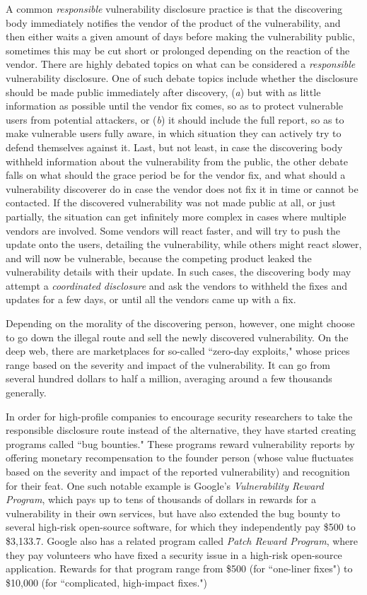 \documentclass[a4paper,12pt]{article}
\begin{document}
	A common \textit{responsible} vulnerability disclosure practice is that the discovering body immediately notifies the vendor of the product of the vulnerability, and then either waits a given amount of days before making the vulnerability public, sometimes this may be cut short or prolonged depending on the reaction of the vendor. There are highly debated topics on what can be considered a \textit{responsible} vulnerability disclosure. One of such debate topics include whether the disclosure should be made public immediately after discovery, (\textit{a}) but with as little information as possible until the vendor fix comes, so as to protect vulnerable users from potential attackers, or (\textit{b}) it should include the full report, so as to make vulnerable users fully aware, in which situation they can actively try to defend themselves against it. Last, but not least, in case the discovering body withheld information about the vulnerability from the public, the other debate falls on what should the grace period be for the vendor fix, and what should a vulnerability discoverer do in case the vendor does not fix it in time or cannot be contacted. If the discovered vulnerability was not made public at all, or just partially, the situation can get infinitely more complex in cases where multiple vendors are involved. Some vendors will react faster, and will try to push the update onto the users, detailing the vulnerability, while others might react slower, and will now be vulnerable, because the competing product leaked the vulnerability details with their update. In such cases, the discovering body may attempt a \textit{coordinated disclosure} and ask the vendors to withheld the fixes and updates for a few days, or until all the vendors came up with a fix.
	
	Depending on the morality of the discovering person, however, one might choose to go down the illegal route and sell the newly discovered vulnerability. On the deep web, there are marketplaces for so-called ``zero-day exploits," whose prices range based on the severity and impact of the vulnerability. It can go from several hundred dollars to half a million, averaging around a few thousands generally\cite{nperlroth13}.
	
	In order for high-profile companies to encourage security researchers to take the responsible disclosure route instead of the alternative, they have started creating programs called ``bug bounties." These programs reward vulnerability reports by offering monetary recompensation to the founder person (whose value fluctuates based on the severity and impact of the reported vulnerability) and recognition for their feat. One such notable example is Google's \textit{Vulnerability Reward Program}\cite{googlevrp15}, which pays up to tens of thousands of dollars in rewards for a vulnerability in their own services, but have also extended the bug bounty to several high-risk open-source software, for which they independently pay \$500 to \$3,133.7. Google also has a related program called \textit{Patch Reward Program}, where they pay volunteers who have fixed a security issue in a high-risk open-source application. Rewards for that program range from \$500 (for ``one-liner fixes") to \$10,000 (for ``complicated, high-impact fixes.")
	
\end{document}
